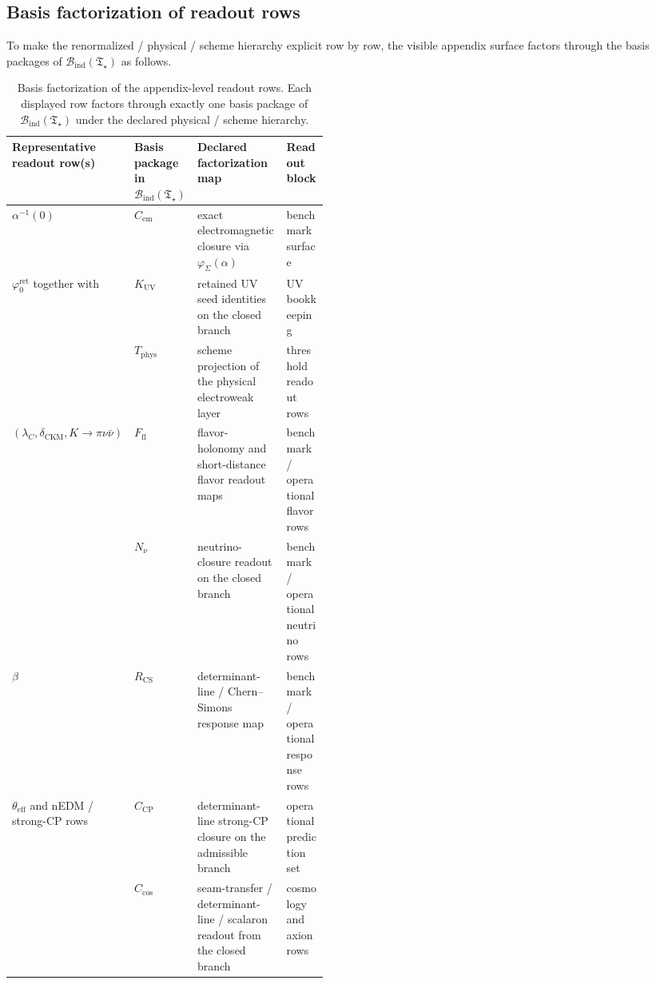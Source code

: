 \documentclass[11pt,a4paper]{article}
\theoremstyle{definition}
\theoremstyle{remark}
\newcommand{\phiz}{\varphi_0^{\mathrm{ret}}}
\newcommand{\phiseam}{\varphi_{\Sigma}}
\newcommand{\Tstar}{\mathfrak T_{\star}}
\newcommand{\Bind}{\mathcal B_{\mathrm{ind}}}
\begin{document}
\subsection{Basis factorization of readout rows}

To make the renormalized / physical / scheme hierarchy explicit row by row, the visible appendix
surface factors through the basis packages of $\Bind(\Tstar)$ as follows.

\begin{table}[t]
\centering
\small
\setlength{\tabcolsep}{3pt}
\begin{tabularx}{\linewidth}{@{}>{\raggedright\arraybackslash}p{0.30\linewidth}>{\raggedright\arraybackslash}p{0.16\linewidth}YY@{}}
\toprule
Representative readout row(s) & Basis package in $\Bind(\Tstar)$ & Declared factorization map & Readout block \\
\midrule
$\alpha^{-1}(0)$ & $C_{\mathrm{em}}$ & exact electromagnetic closure via $\phiseam(\alpha)$ & benchmark surface \\
$\phiz$ together with  & $K_{\mathrm{UV}}$ & retained UV seed identities on the closed branch & UV bookkeeping \\
{} & $T_{\mathrm{phys}}$ & scheme projection of the physical electroweak layer & threshold readout rows \\
$(\lambda_C,\delta_{\mathrm{CKM}},K\to\pi\nu\bar\nu)$ & $F_{\mathrm{fl}}$ & flavor-holonomy and short-distance flavor readout maps & benchmark / operational flavor rows \\
{} & $N_{\nu}$ & neutrino-closure readout on the closed branch & benchmark / operational neutrino rows \\
$\beta$ & $R_{\mathrm{CS}}$ & determinant-line / Chern--Simons response map & benchmark / operational response rows \\
$\theta_{\mathrm{eff}}$ and nEDM / strong-CP rows & $C_{\mathrm{CP}}$ & determinant-line strong-CP closure on the admissible branch & operational prediction set \\
{} & $C_{\mathrm{cos}}$ & seam-transfer / determinant-line / scalaron readout from the closed branch & cosmology and axion rows \\
\bottomrule
\end{tabularx}
\caption{Basis factorization of the appendix-level readout rows. Each displayed row factors through
exactly one basis package of $\Bind(\Tstar)$ under the declared physical / scheme hierarchy.}
\label{tab:basis-factorization}
\end{table}
\end{document}
